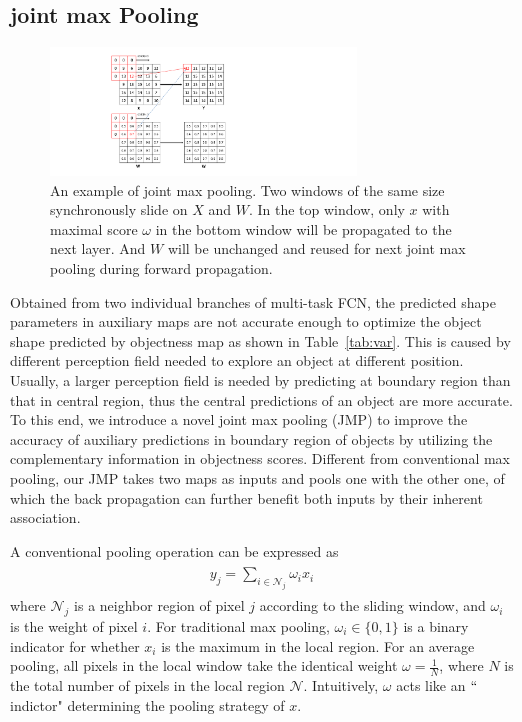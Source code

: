 \subsection{joint max Pooling}
\label{sec:joint-max-pooling}
\begin{figure}
    \begin{center}
        \includegraphics[width=3.2in]{figures/FigJMP.pdf}
    \end{center}
    \caption{An example of joint max pooling.
        Two windows of the same size synchronously slide on $X$ and $W$.
        In the top window, only $x$ with maximal score $\omega$ in the bottom window will be propagated to the next layer.
        And $W$ will be unchanged and reused for next joint max pooling during forward propagation.}
    \label{FigJMP}
\end{figure}

Obtained from two individual branches of multi-task FCN, the predicted shape parameters in auxiliary maps are not accurate enough to optimize the object shape predicted by objectness map as shown in Table~\ref{tab:var}.
This is caused by different perception field needed to explore an object at different position.
Usually, a larger perception field is needed by predicting at boundary region than that in central region, thus the central predictions of an object are more accurate.
To this end, we introduce a novel joint max pooling (JMP) to improve the accuracy of auxiliary predictions in boundary region of objects by utilizing the complementary information in objectness scores.
Different from conventional max pooling, our JMP takes two maps as inputs and pools one with the other one, of which the back propagation can further benefit both inputs by their inherent association.

A conventional pooling operation can be expressed as
\begin{eqnarray}\label{pooling}
\begin{aligned}
y_{j} = \sum_{i\in \mathcal{N}_{j}} \omega_{i}x_{i}
\end{aligned}
\end{eqnarray}
where $\mathcal{N}_{j}$ is a neighbor region of pixel $j$ according to the sliding window, and $\omega_{i}$ is the weight of pixel $i$.
For traditional max pooling, $\omega_i \in \{0,1\}$ is a binary indicator for whether $x_i$ is the maximum in the local region.
For an average pooling, all pixels in the local window take the identical weight $\omega=\frac{1}{N}$, where $N$ is the total number of pixels in the local region $\mathcal{N}$.
Intuitively, $\omega$ acts like an $``$indictor" determining the pooling strategy of $x$.

